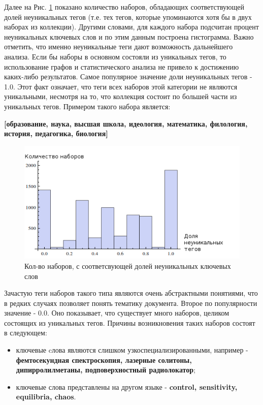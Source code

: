 Далее на Рис. \ref{img:abstr_hist} показано количество наборов, обладающих соответствующей долей неуникальных тегов (т.е. тех тегов, которые упоминаются хотя бы в двух наборах из коллекции). Другими словами, для каждого набора подсчитан процент неуникальных ключевых слов и по этим данным построена гистограмма. Важно отметить, что именно неуникальные теги дают возможность дальнейшего анализа. Если бы наборы в основном состояли из уникальных тегов, то использование графов и статистического анализа не привело к достижению каких-либо результатов. Самое популярное значение доли неуникальных тегов - 1.0. Этот факт означает, что теги всех наборов этой категории не являются уникальными, несмотря на то, что коллекция состоит по большей части из уникальных тегов. Примером такого набора является:

\textbf{[образование, наука, высшая школа, идеология, математика, филология, история, педагогика, биология]}

\begin{figure}[ht]
  \begin{minipage}[ht]{1.0\linewidth}\centering
    \includegraphics[width=0.5\linewidth]{Dissertation/pics/abstr_hist}
    \caption{Кол-во наборов, с соответсвующей долей неуникальных ключевых слов}
  \end{minipage}
  \label{img:abstr_hist}
\end{figure}

Зачастую теги наборов такого типа являются очень абстрактными понятиями, что в редких случаях позволяет понять тематику документа. Второе по популярности значение - 0.0. Оно показывает, что существует много наборов, целиком состоящих из уникальных тегов. Причины возникновения таких наборов состоят в следующем:

\begin{itemize}
    \item ключевые cлова являются слишком узкоспециализированными, например - \textbf{фемтосекундная спектроскопия, лазерные солитоны, дипирролилметаны, подповерхностный радиолокатор};
    \item ключевые слова представлены на другом языке - \textbf{control, sensitivity, equilibria, chaos}.
\end{itemize}

